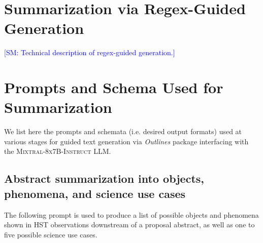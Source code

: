 \documentclass[10pt]{article} %
\newcommand{\package}[1]{\textsl{#1}\xspace}
\newcommand{\SM}[1]{\textcolor{blue}{[SM: #1]}}
\begin{document}



\appendix
\section{Summarization via Regex-Guided Generation}
\label{app:guided-generation}

\SM{Technical description of regex-guided generation.}

\section{Prompts and Schema Used for Summarization}
\label{app:prompts}

We list here the prompts and schemata (i.e.
%
desired output formats) used at various stages for guided text generation via \package{Outlines} package interfacing with the \textsc{Mixtral-8x7B-Instruct} LLM.

\subsection{Abstract summarization into objects, phenomena, and science use cases}
\label{app:summarization}

The following prompt is used to produce a list of possible objects and phenomena shown in HST observations downstream of a proposal abstract, as well as one to five possible science use cases.
\end{document}
